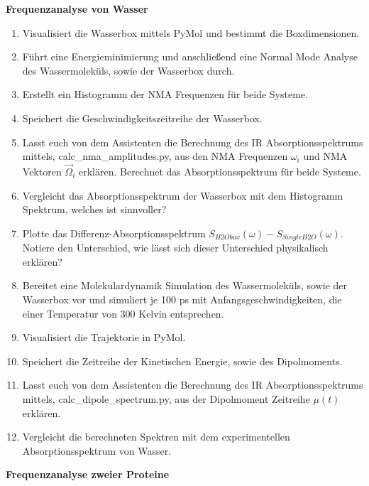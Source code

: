 \documentclass[a4paper,12pt]{article}
\begin{document}
\textbf{Frequenzanalyse von Wasser}
\begin{enumerate}
 \item Visualisiert die Wasserbox mittels PyMol und bestimmt die Boxdimensionen.
 \item Führt eine Energieminimierung und anschließend eine Normal Mode Analyse des Wassermoleküls, sowie der Wasserbox durch.
 \item Erstellt ein Histogramm der NMA Frequenzen für beide Systeme.
 \item Speichert die Geschwindigkeitszeitreihe der Wasserbox.
 \item Lasst euch von dem Assistenten die Berechnung des IR Absorptionsspektrums mittels, calc\_nma\_amplitudes.py, aus den NMA Frequenzen $\omega_i$ und NMA Vektoren $\vec{\Omega}_i$ erklären.
 Berechnet das Absorptionsspektrum für beide Systeme.
 \item Vergleicht das Absorptionsspektrum der Wasserbox mit dem Histogramm Spektrum, welches ist sinnvoller?
 \item Plotte das Differenz-Absorptionsspektrum $S_{H2Obox}(\omega)-S_{SingleH2O}(\omega)$. Notiere den Unterschied, wie lässt sich dieser Unterschied physikalisch erklären?
 \item Bereitet eine Molekulardynamik Simulation des Wassermoleküls, sowie der Wasserbox vor und simuliert je 100 ps mit Anfangsgeschwindigkeiten, die einer Temperatur von 300 Kelvin entsprechen.
 \item Visualisiert die Trajektorie in PyMol.
 \item Speichert die Zeitreihe der Kinetischen Energie, sowie des Dipolmoments. 
 \item Lasst euch von dem Assistenten die Berechnung des IR Absorptionsspektrums mittels, calc\_dipole\_spectrum.py, aus der Dipolmoment Zeitreihe $\mu(t)$ erklären.
 \item Vergleicht die berechneten Spektren mit dem experimentellen Absorptionsspektrum von Wasser.
\end{enumerate}

\textbf{Frequenzanalyse zweier Proteine}
\end{document}
